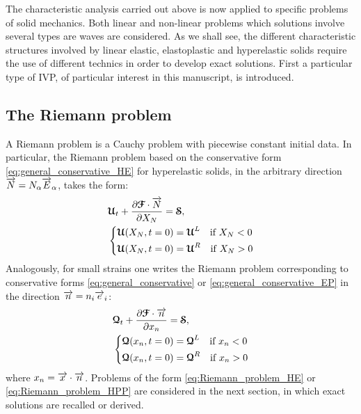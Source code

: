 The characteristic analysis carried out above is now applied to specific problems of solid mechanics. Both linear and non-linear problems which solutions involve several types are waves are considered.
As we shall see, the different characteristic structures involved by linear elastic, elastoplastic and hyperelastic solids require the use of different technics in order to develop exact solutions. First a particular type of IVP, of particular interest in this manuscript, is introduced.
\subsection{The Riemann problem}
A Riemann problem is a Cauchy problem with piecewise constant initial data. In particular, the Riemann problem based on the conservative form \eqref{eq:general_conservative_HE} for hyperelastic solids, in the arbitrary direction ${\overrightarrow{N}}=N_\alpha {\overrightarrow{E}}_\alpha$, takes the form:
\begin{equation}
  \label{eq:Riemann_problem_HE}
  \begin{aligned}
    &{\boldsymbol{\mathcal{U}}}_t + \frac{\partial {\boldsymbol{\mathcal{F}}}\cdot {\overrightarrow{N}}}{\partial X_N} = {\boldsymbol{\mathcal{S}}}, \\
    &\left\lbrace 
      \begin{aligned}
        & {\boldsymbol{\mathcal{U}}}(X_N,t=0) = {\boldsymbol{\mathcal{U}}}^L \quad \text{if } X_N< 0\\
        & {\boldsymbol{\mathcal{U}}}(X_N,t=0) = {\boldsymbol{\mathcal{U}}}^R \quad \text{if } X_N> 0
      \end{aligned}
    \right.
  \end{aligned}
\end{equation}
Analogously, for small strains one writes the Riemann problem corresponding to conservative forms \eqref{eq:general_conservative} or \eqref{eq:general_conservative_EP} in the direction ${\overrightarrow{n}}=n_i {\overrightarrow{e}}_i$:
\begin{equation}
  \label{eq:Riemann_problem_HPP}
  \begin{aligned}
    &{\boldsymbol{\mathcal{Q}}}_t + \frac{\partial {\boldsymbol{\mathcal{F}}}\cdot {\overrightarrow{n}}}{\partial x_n} = {\boldsymbol{\mathcal{S}}}, \\
    &\left\lbrace 
      \begin{aligned}
        & {\boldsymbol{\mathcal{Q}}}(x_n,t=0) = {\boldsymbol{\mathcal{Q}}}^L \quad \text{if } x_n< 0\\
        & {\boldsymbol{\mathcal{Q}}}(x_n,t=0) = {\boldsymbol{\mathcal{Q}}}^R \quad \text{if } x_n> 0
      \end{aligned}
    \right.
  \end{aligned}
\end{equation}
where $x_n={\overrightarrow{x}}\cdot{\overrightarrow{n}}$.
Problems of the form \eqref{eq:Riemann_problem_HE} or \eqref{eq:Riemann_problem_HPP} are considered in the next section, in which exact solutions are recalled or derived.

